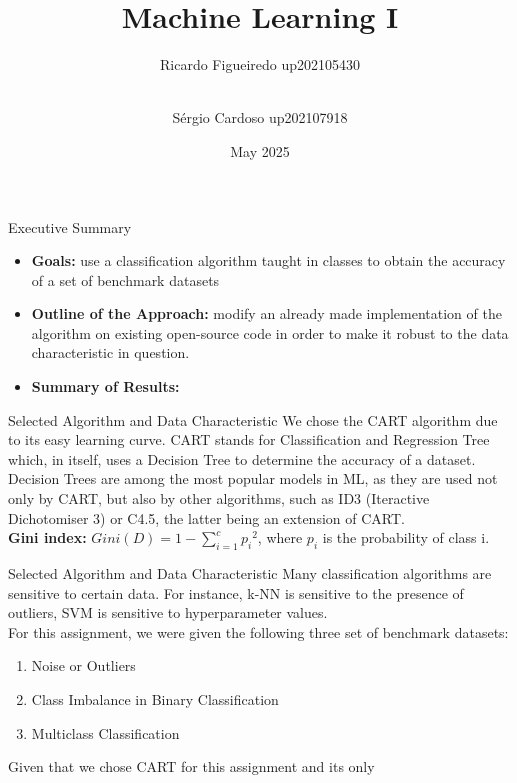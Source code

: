 \documentclass{beamer}
\title{Machine Learning I}
\author[Ricardo Figueiredo, Sérgio Cardoso]
{Ricardo Figueiredo up202105430 \and \\ Sérgio Cardoso up202107918}
\date{May 2025}
\begin{document}
\maketitle

\begin{frame}{Executive Summary}
    \begin{itemize}
        \item \textbf{Goals:} use a classification algorithm taught in classes 
        to obtain the accuracy of a set of benchmark datasets
        \item \textbf{Outline of the Approach:} modify an already 
        made implementation of the algorithm on existing open-source 
        code in order to make it robust to the data 
        characteristic in question.
        \item \textbf{Summary of Results:}
    \end{itemize}
\end{frame}

\begin{frame}{Selected Algorithm and Data Characteristic}
    We chose the CART algorithm due to its easy learning curve. 
    CART stands for Classification and Regression Tree which, in 
    itself, uses a Decision Tree to determine the accuracy of a dataset. 
    Decision Trees are among the most popular models in ML, as they are used 
    not only by CART, but also by other algorithms, such as ID3 (Iteractive 
    Dichotomiser 3) or C4.5, the latter being an extension of CART. \\ 
    \textbf{Gini index:} $Gini(D) = 1 - \sum_{i = 1}^{c} {p_{i}}^2$, where
    $p_{i}$ is the probability of class i.

\end{frame}

\begin{frame}{Selected Algorithm and Data Characteristic}
        Many classification algorithms are sensitive to certain data. For 
        instance, k-NN is sensitive to the presence of outliers, 
        SVM is sensitive to hyperparameter values. \\ 
        For this assignment, we were given the following three set of 
        benchmark datasets:
        \begin{enumerate}
            \item Noise or Outliers 
            \item Class Imbalance in Binary Classification 
            \item Multiclass Classification
        \end{enumerate}
        Given that we chose CART for this assignment and its 
        only
\end{frame}
\end{document}
